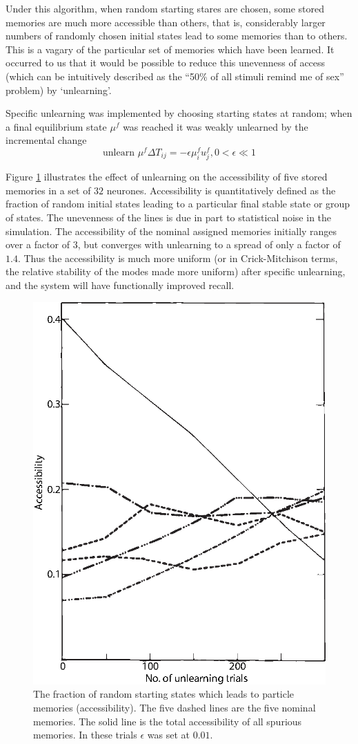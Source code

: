 \documentclass[11pt,letterpaper]{article}
\begin{document}
	Under this algorithm, when random starting stares are chosen, some stored memories are much more accessible than others, that is, considerably larger numbers of randomly chosen initial states lead to some memories than to others. This is a vagary of the particular set of memories which have been learned. It occurred to us that it would be possible to reduce this unevenness of access (which can be intuitively described as the ``50\% of all stimuli remind me of sex'' problem) by `unlearning'.
	
	Specific unlearning was implemented by choosing starting states at random; when a final equilibrium state $\mu^{f}$ was reached it was weakly unlearned by the incremental change
	\begin{equation}
		\text{unlearn } \mu^{f} \Delta T_{ij} = - \epsilon \mu_{i}^{f} u_{j}^{f} , 0 < \epsilon \ll 1
	\end{equation}

	Figure \ref{figure-1} illustrates the effect of unlearning on the accessibility of five stored memories in a set of $32$ neurones. Accessibility is quantitatively defined as the fraction of random initial states leading to a particular final stable state or group of states. The unevenness of the lines is due in part to statistical noise in the simulation. The accessibility of the nominal assigned memories initially ranges over a factor of $3$, but converges with unlearning to a spread of only a factor of $1.4$. Thus the accessibility is much more uniform (or in Crick-Mitchison terms, the relative stability of the modes made more uniform) after specific unlearning, and the system will have functionally improved recall.
	
	\begin{figure}[h]
		\begin{center}
			\includegraphics[width=0.5\linewidth]{Hopfield-1983-Figure-1.eps}
		\end{center}
		\caption{The fraction of random starting states which leads to particle memories (accessibility). The five dashed lines are the five nominal memories. The solid line is the total accessibility of all spurious memories. In these trials $\epsilon$ was set at $0.01$.} \label{figure-1}
	\end{figure}
\end{document}
